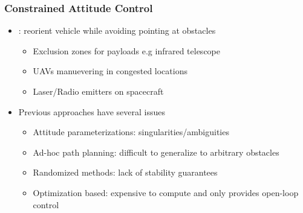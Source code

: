 \begin{frame}[t,noframenumbering]\frametitle{Constrained Attitude Control}
\label{slide:attitude_constraints}
    \begin{itemize}
    \item {} : reorient vehicle while avoiding pointing at obstacles
    \begin{itemize}
        \item Exclusion zones for payloads e.g infrared telescope
        \item UAVs manuevering in congested locations
        \item Laser/Radio emitters on spacecraft
    \end{itemize}
    \pause
    \vs
    \item Previous approaches have several issues
    \begin{itemize}
        \item Attitude parameterizations: singularities/ambiguities
        \item Ad-hoc path planning: difficult to generalize to arbitrary obstacles
        \item Randomized methods: lack of stability guarantees
        \item Optimization based: expensive to compute and only provides open-loop control  
    \end{itemize}
\end{itemize}


\end{frame}
